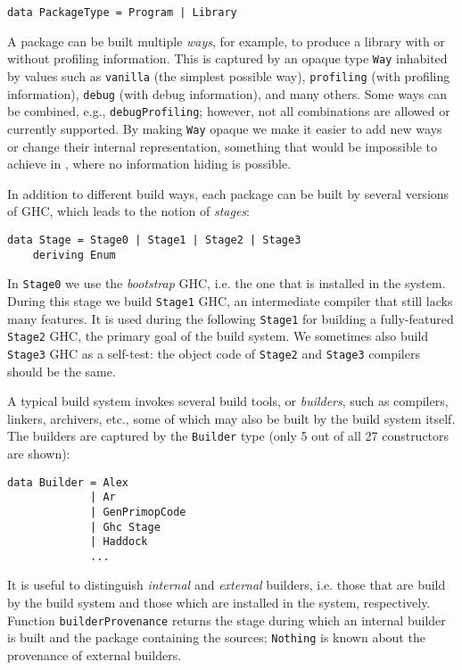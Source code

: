 \begin{lstlisting}[basicstyle=\ttfamily]
data PackageType = Program | Library
\end{lstlisting}

A package can be built multiple \emph{ways}, for example, to produce a library
with or without profiling information. This is captured by an opaque
type \texttt{Way} inhabited by values such as \texttt{vanilla} (the simplest
possible way), \texttt{profiling} (with profiling information), \texttt{debug} (with
debug information), and many others. Some ways can be combined, e.g.,
\texttt{debugProfiling}; however, not all combinations are allowed or currently
supported. By making \texttt{Way} opaque we make it easier to add new ways
or change their internal representation, something that would be
impossible to achieve in \make{}, where no information hiding is
possible.
 
In addition to different build ways, each package can be built by several
versions of GHC, which leads to the notion of \emph{stages}:

\begin{lstlisting}[basicstyle=\ttfamily]
data Stage = Stage0 | Stage1 | Stage2 | Stage3
    deriving Enum
\end{lstlisting}

In \texttt{Stage0} we use the \emph{bootstrap} GHC, i.e. the one that is
installed in the system. During this stage we build \texttt{Stage1} GHC, an
intermediate compiler that still lacks many features. It is used during the
following \texttt{Stage1} for building a fully-featured \texttt{Stage2} GHC, the
primary goal of the build system. We sometimes also build \texttt{Stage3} GHC as
a self-test: the object code of \texttt{Stage2} and \texttt{Stage3} compilers
should be the same.

A typical build system invokes several build tools, or \emph{builders}, such as
compilers, linkers, archivers, etc., some of which may also be built by the
build system itself. The builders are captured by the \texttt{Builder} type
(only 5 out of all 27 constructors are shown):

\begin{lstlisting}[basicstyle=\ttfamily]
data Builder = Alex
             | Ar
             | GenPrimopCode
             | Ghc Stage
             | Haddock
             ...
\end{lstlisting}

It is useful to distinguish \emph{internal} and \emph{external} builders, i.e.
those that are build by the build system and those which are installed in the
system, respectively. Function \texttt{builderProvenance} returns the stage
during which an internal builder is built and the package containing the
sources; \texttt{Nothing} is known about the provenance of external builders.

